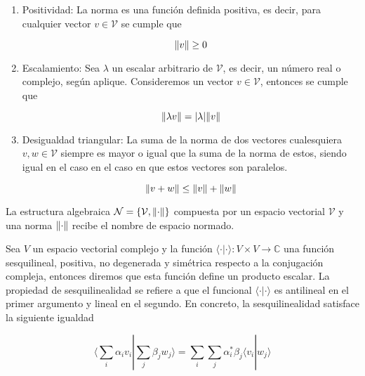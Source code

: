 \begin{enumerate}
    \item Positividad: La norma es una función definida positiva, es decir, para cualquier vector $v \in \mathcal{V}$ se cumple que

        \begin{equation}
            \norm{v} \geq 0
        \end{equation}

    \item Escalamiento: Sea $\lambda$ un escalar arbitrario de $\mathcal{V}$, es decir, un número real o complejo, según aplique. Consideremos un vector $v \in \mathcal{V}$, entonces se cumple que

        \begin{equation}
            \norm{\lambda v} = \abs{\lambda} \norm{v}
        \end{equation}

    \item Desigualdad triangular: La suma de la norma de dos vectores cualesquiera $v, w \in \mathcal{V}$ siempre es mayor o igual que la suma de la norma de estos, siendo igual en el caso en el caso en que estos vectores son paralelos.

        \begin{equation}
            \norm{v + w} \leq \norm{v} + \norm{w}
        \end{equation}

\end{enumerate}

La estructura algebraica $\mathcal{N} = \{\mathcal{V}, \norm{\cdot}\}$ compuesta por un espacio vectorial $\mathcal{V}$ y una norma $\norm{\cdot}$ recibe el nombre de espacio normado.

Sea $\mathit{V}$ un espacio vectorial complejo y la función $\langle \cdot | \cdot \rangle: \mathit{V} \times \mathit{V} \rightarrow \mathds{C}$ una función sesquilineal, positiva, no degenerada y simétrica respecto a la conjugación compleja, entonces diremos que esta función define un producto escalar. La propiedad de sesquilinealidad se refiere a que el funcional $\langle \cdot | \cdot \rangle$ es antilineal en el primer argumento y lineal en el segundo. En concreto, la sesquilinealidad satisface la siguiente igualdad

\begin{equation}
    \langle \sum_i \alpha_i v_i | \sum_j \beta_j w_j \rangle = \sum_i \sum_j \alpha_i^* \beta_j \langle v_i | w_j \rangle
\end{equation}

